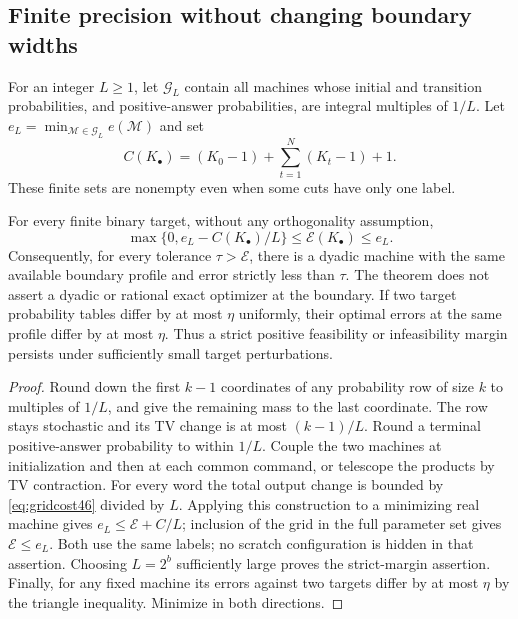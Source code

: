 \subsection{Finite precision without changing boundary widths}
For an integer $L\ge1$, let $\mathcal G_L$ contain all machines whose
initial and transition probabilities, and positive-answer probabilities,
are integral multiples of $1/L$. Let
$e_L=\min_{\mathcal M\in\mathcal G_L}e(\mathcal M)$ and set
\begin{equation}\label{eq:gridcost46}
 C(K_\bullet)=(K_0-1)+\sum_{t=1}^N(K_t-1)+1.
\end{equation}
These finite sets are nonempty even when some cuts have only one label.

\begin{theorem}\label{thm:grid46}
For every finite binary target, without any orthogonality assumption,
\begin{equation}\label{eq:grid46}
 \max\{0,e_L-C(K_\bullet)/L\}
       \le\mathcal E(K_\bullet)\le e_L.
\end{equation}
Consequently, for every tolerance $\tau>\mathcal E$, there is a dyadic
machine with the same available boundary profile and error strictly
less than $\tau$. The theorem
does not assert a dyadic or rational exact optimizer at the boundary.
If two target probability tables differ by at most $\eta$ uniformly,
their optimal errors at the same profile differ by at most $\eta$.
Thus a strict positive feasibility or infeasibility margin persists
under sufficiently small target perturbations.
\end{theorem}
\begin{proof}
Round down the first $k-1$ coordinates of any probability row of size
$k$ to multiples of $1/L$, and give the remaining mass to the last
coordinate. The row stays stochastic and its TV change is at most
$(k-1)/L$. Round a terminal positive-answer probability to within $1/L$.
Couple the two machines at initialization and then at each common
command, or telescope the products by TV contraction. For every word
the total output change is bounded by \eqref{eq:gridcost46} divided by
$L$. Applying this construction to a minimizing real machine gives
$e_L\le\mathcal E+C/L$; inclusion of the grid in the full parameter
set gives $\mathcal E\le e_L$. Both use the same labels; no scratch
configuration is hidden in that assertion. Choosing $L=2^b$ sufficiently
large proves the strict-margin assertion. Finally, for any fixed
machine its errors against two targets differ by at most $\eta$ by the
triangle inequality. Minimize in both directions.
\end{proof}

